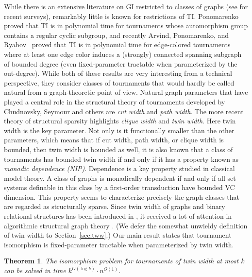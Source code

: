 \PassOptionsToPackage{dvipsnames,svgnames}{xcolor}\documentclass[10pt,a4paper]{article}
\newtheorem{theorem}{Theorem}[section]
\begin{document}
While there is an extensive literature on GI restricted to classes of graphs (see \cite{GroheN21,Neuen26} for recent surveys), remarkably little is known for restrictions of TI.
Ponomarenko \cite{Ponomarenko92} proved that TI is in polynomial time for tournaments whose automorphism group contains a regular cyclic subgroup,
and recently Arvind, Ponomarenko, and Ryabov~\cite{ArvindPR25} proved that TI is in polynomial time for edge-colored tournaments where at least one edge color induces a (strongly) connected spanning subgraph of bounded degree (even fixed-parameter tractable when parameterized by the out-degree).
While both of these results are very interesting from a technical perspective, they consider classes of tournaments that would hardly be called natural from a graph-theoretic point of view.
Natural graph parameters that have played a central role in the structural theory of tournaments developed by Chudnovsky, Seymour and others \cite{ChudnovskyFS12,ChudnovskyKLST18,ChudnovskySS19,ChudnovskyS11,FominP19} are \emph{cut width} and \emph{path width}.
The more recent theory of structural sparsity \cite{GajarskyKNMPST20,GajarskyPT22,NesetrilO16,NesetrilMS22} highlights \emph{clique width} and \emph{twin width}.
Here twin width is the key parameter.
Not only is it functionally smaller than the other parameters, which means that if cut width, path width, or clique width is bounded, then twin width is bounded as well, it is also known \cite{GenietT26} that a class of tournaments has bounded twin width if and only if it has a property known as \emph{monadic dependence (NIP)}.
Dependence is a key property studied in classical model theory.
A class of graphs is monadically dependent if and only if all set systems definable in this class by a first-order transduction have bounded VC dimension.
This property seems to characterize precisely the graph classes that are regarded as structurally sparse.
Since twin width of graphs and binary relational structures has been introduced in \cite{BonnetKTW22}, it received a lot of attention in algorithmic structural graph theory
\cite{BonnetGKTW22,BonnetGKTW24,BonnetGMSTT24,BonnetGMT23,BonnetKRT22,BonnetKRTW22,GajarskyPT22,GanianPSSS22,GenietT26,HlinenyJ25,Thomasse22}.
(We defer the somewhat unwieldy definition of twin width to Section~\ref{sec:tww}.)
Our main result states that tournament isomorphism is fixed-parameter tractable when parameterized by twin width.


\begin{theorem}
 \label{thm:tww-isomorphism-intro}
 The isomorphism problem for tournaments of twin width at most $k$ can be solved in time $k^{O(\log k)}\cdot n^{O(1)}$.
\end{theorem}
\end{document}
